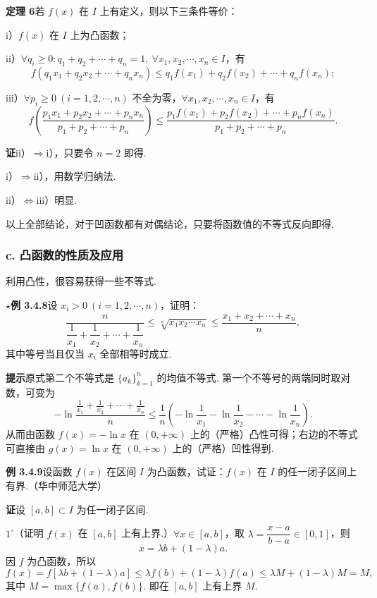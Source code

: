 \documentclass[UTF8, 12pt, fontset=fandol, oneside]{ctexart}
\begin{document}
\noindent\textbf{定理 6}\quad 若 $f(x)$ 在 $I$ 上有定义，则以下三条件等价：

i）$f(x)$ 在 $I$ 上为凸函数；

ii）$\forall q_i\ge0:q_1+q_2+\cdots+q_n=1,\ \forall x_1,x_2,\cdots,x_n\in I$，有
\[
  f(q_1x_1+q_2x_2+\cdots+q_nx_n)
  \le q_1f(x_1)+q_2f(x_2)+\cdots+q_nf(x_n);
\]

iii）$\forall p_i\ge0\ (i=1,2,\cdots,n)$ 不全为零，$\forall x_1,x_2,\cdots,x_n\in I$，有
\[
  f\left(\frac{p_1x_1+p_2x_2+\cdots+p_nx_n}{p_1+p_2+\cdots+p_n}\right)
  \le \frac{p_1f(x_1)+p_2f(x_2)+\cdots+p_nf(x_n)}
  {p_1+p_2+\cdots+p_n}.
\]

\noindent\textbf{证}\quad ii）$\Rightarrow$i），只要令 $n=2$ 即得.

i）$\Rightarrow$ii），用数学归纳法.

ii）$\Leftrightarrow$iii）明显.

以上全部结论，对于凹函数都有对偶结论，只要将函数值的不等式反向即得.

\subsubsection*{c. 凸函数的性质及应用}

利用凸性，很容易获得一些不等式.

\noindent\textbf{$\star$例 3.4.8}\quad 设 $x_i>0\ (i=1,2,\cdots,n)$，证明：
\[
  \frac{n}{\dfrac1{x_1}+\dfrac1{x_2}+\cdots+\dfrac1{x_n}}
  \le \sqrt[n]{x_1x_2\cdots x_n}
  \le \frac{x_1+x_2+\cdots+x_n}{n},
\]
其中等号当且仅当 $x_i$ 全部相等时成立.

\noindent\textbf{提示}\quad 原式第二个不等式是 $\{a_k\}_{k=1}^n$ 的均值不等式. 第一个不等号的两端同时取对数，可变为
\[
  -\ln\frac{\frac1{x_1}+\frac1{x_2}+\cdots+\frac1{x_n}}n
  \le \frac1n\left(-\ln\frac1{x_1}-\ln\frac1{x_2}-\cdots-\ln\frac1{x_n}\right).
\]
从而由函数 $f(x)=-\ln x$ 在 $(0,+\infty)$ 上的（严格）凸性可得；右边的不等式可直接由 $g(x)=\ln x$ 在 $(0,+\infty)$ 上的（严格）凹性得到.

\noindent\textbf{例 3.4.9}\quad 设函数 $f(x)$ 在区间 $I$ 为凸函数，试证：$f(x)$ 在 $I$ 的任一闭子区间上有界.（华中师范大学）

\noindent\textbf{证}\quad 设 $[a,b]\subset I$ 为任一闭子区间.

$1^\circ$（证明 $f(x)$ 在 $[a,b]$ 上有上界.）$\forall x\in[a,b]$，取 $\lambda=\dfrac{x-a}{b-a}\in[0,1]$，则
\[
  x=\lambda b+(1-\lambda)a.
\]
因 $f$ 为凸函数，所以
\[
  f(x)=f[\lambda b+(1-\lambda)a]\le \lambda f(b)+(1-\lambda)f(a)\le \lambda M+(1-\lambda)M=M,
\]
其中 $M=\max\{f(a),f(b)\}$. 即在 $[a,b]$ 上有上界 $M$.
\end{document}
